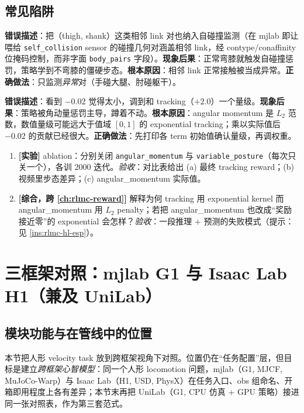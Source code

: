 \subsection{常见陷阱}
\begin{pitfall}
\textbf{错误描述}：把（thigh, shank）这类相邻 link 对也纳入自碰撞监测（在 mjlab 即让喂给 \texttt{self\_collision} sensor 的碰撞几何对涵盖相邻 link，经 contype/conaffinity 位掩码控制，而非字面 \texttt{body\_pairs} 字段）。\textbf{现象后果}：正常弯膝就触发自碰撞惩罚，策略学到不弯膝的僵硬步态。\textbf{根本原因}：相邻 link 正常接触被当成异常。\textbf{正确做法}：只监测\emph{异常}对（手碰大腿、肘碰躯干）。
\end{pitfall}

\begin{pitfall}
\textbf{错误描述}：看到 $-0.02$ 觉得太小，调到和 tracking（$+2.0$）一个量级。\textbf{现象后果}：策略被角动量惩罚主导，蹲着不动。\textbf{根本原因}：angular momentum 是 $L_2$ 范数，数值量级可能远大于值域 $[0,1]$ 的 exponential tracking；乘以实际值后 $-0.02$ 的贡献已经很大。\textbf{正确做法}：先打印各 term 初始值确认量级，再调权重。
\end{pitfall}

\begin{practice}[本节动手]
\begin{enumerate}
  \item \textbf{[实验]} ablation：分别关闭 \texttt{angular\_momentum} 与 \texttt{variable\_posture}（每次只关一个），各训 $2000$ 迭代。\emph{验收}：对比表给出 (a) 最终 tracking reward；(b) 视频里步态差异；(c) angular\_momentum 实际值。
  \item \textbf{[综合，跨 \cref{ch:rlmc-reward}]} 解释为何 tracking 用 exponential kernel 而 angular\_momentum 用 $L_2$ penalty；若把 angular\_momentum 也改成“奖励接近零”的 exponential 会怎样？\emph{验收}：一段推理 $+$ 预测的失败模式（提示：见 \cref{ins:rlmc-hl-esp}）。
\end{enumerate}
\end{practice}

\section{三框架对照：mjlab G1 与 Isaac Lab H1（兼及 UniLab）}\label{sec:rlmc-hl-isaac}

\subsection{模块功能与在管线中的位置}
本节把人形 velocity task 放到跨框架视角下对照。位置仍在“任务配置”层，但目标是建立\emph{跨框架心智模型}：同一个人形 locomotion 问题，mjlab（G1, MJCF, MuJoCo-Warp）与 Isaac Lab（H1, USD, PhysX）在任务入口、obs 组命名、开箱即用程度上各有差异；本节末再把 UniLab（G1, CPU 仿真 $+$ GPU 策略）接进同一张对照表，作为第三套范式。


